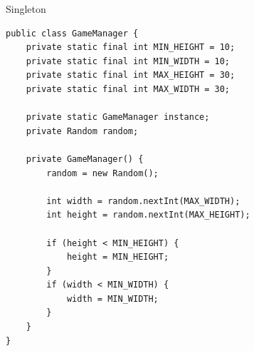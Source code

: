 \begin{frame}[fragile]{Singleton}
	\begin{exampleblock}{}
		\begin{lstlisting}
public class GameManager {
	private static final int MIN_HEIGHT = 10;
	private static final int MIN_WIDTH = 10;
	private static final int MAX_HEIGHT = 30;
	private static final int MAX_WIDTH = 30;
	
    private static GameManager instance;
    private Random random;

    private GameManager() {
        random = new Random();
        
        int width = random.nextInt(MAX_WIDTH);
    	int height = random.nextInt(MAX_HEIGHT);
    	
    	if (height < MIN_HEIGHT) {
    		height = MIN_HEIGHT;
    	}
    	if (width < MIN_WIDTH) {
    		width = MIN_WIDTH;
    	}
    }
}
	 	\end{lstlisting}
 	\end{exampleblock}
\end{frame}
